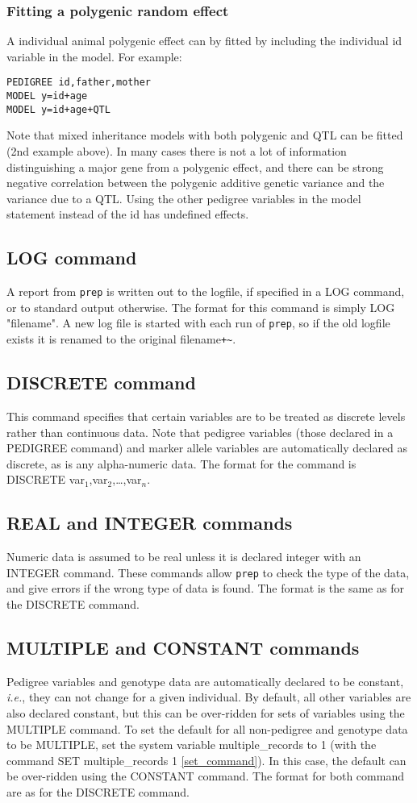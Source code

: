 \documentclass[10pt,a4paper]{article}
\newcommand{\IE}{\textit{i.e.},\xspace}
\newcommand{\Prep}{\texttt{prep}\xspace}
\begin{document}
\subsubsection{Fitting a polygenic random effect}
\label{lab_model_poly}
A individual animal polygenic effect can by fitted by including the
individual id variable in the model.  For example:
\begin{verbatim}
PEDIGREE id,father,mother
MODEL y=id+age
MODEL y=id+age+QTL
\end{verbatim}
Note that mixed inheritance models with both polygenic and QTL can be fitted
(2nd example above).  In many cases there is not a lot of information
distinguishing a major gene from a polygenic effect, and there can be strong
negative correlation between the polygenic additive genetic variance and the
variance due to a QTL.  Using the other pedigree variables in the model
statement instead of the id has undefined effects.
\subsection{LOG command}
A report from \Prep is written out to the logfile, if specified in a LOG
command, or to standard output otherwise.  The format for this command is
simply LOG "filename".  A new log file is started with each run of \Prep, so
if the old logfile exists it is renamed to the original filename\verb/+~/.
\subsection{DISCRETE command}
This command specifies that certain variables are to be treated as discrete
levels rather than continuous data.  Note that pedigree variables (those
declared in a PEDIGREE command) and marker allele variables are
automatically declared as discrete, as is any alpha-numeric data.  The
format for the command is DISCRETE var$_1$,var$_2$,\ldots ,var$_n$.
\subsection{REAL and INTEGER commands}
Numeric data is assumed to be real unless it is declared integer with an INTEGER
command.  These commands allow \Prep to check the type of the data, and give
errors if the wrong type of data is found.  The format is the same as for the
DISCRETE command.
\subsection{MULTIPLE and CONSTANT commands}
Pedigree variables and genotype data are automatically declared to be
constant, \IE they can not change for a given individual.  By default, all
other variables are also declared constant, but this can be over-ridden for
sets of variables using the MULTIPLE command.  To set the default for all
non-pedigree and genotype data to be MULTIPLE, set the system variable
multiple\_records to 1 (with the command SET multiple\_records 1
\ref{set_command}).  In this
case, the default can be over-ridden using the CONSTANT command.  The format
for both command are as for the DISCRETE command.
\end{document}
